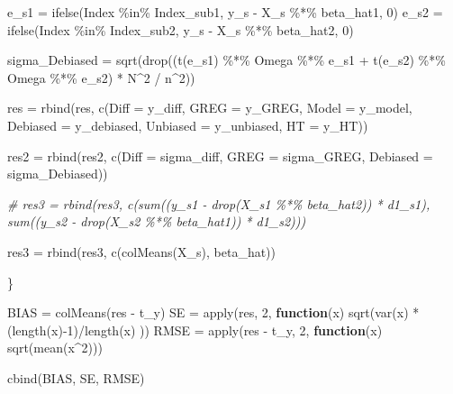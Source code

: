 \documentclass[
]{article}
\newenvironment{Shaded}{\begin{snugshade}}{\end{snugshade}}
\newcommand{\AttributeTok}[1]{\textcolor[rgb]{0.77,0.63,0.00}{#1}}
\newcommand{\CommentTok}[1]{\textcolor[rgb]{0.56,0.35,0.01}{\textit{#1}}}
\newcommand{\ControlFlowTok}[1]{\textcolor[rgb]{0.13,0.29,0.53}{\textbf{#1}}}
\newcommand{\DecValTok}[1]{\textcolor[rgb]{0.00,0.00,0.81}{#1}}
\newcommand{\FunctionTok}[1]{\textcolor[rgb]{0.00,0.00,0.00}{#1}}
\newcommand{\NormalTok}[1]{#1}
\newcommand{\OtherTok}[1]{\textcolor[rgb]{0.56,0.35,0.01}{#1}}
\newcommand{\SpecialCharTok}[1]{\textcolor[rgb]{0.00,0.00,0.00}{#1}}
\begin{document}
\begin{Shaded}
\begin{Highlighting}[]
\NormalTok{e\_s1 }\OtherTok{=} \FunctionTok{ifelse}\NormalTok{(Index }\SpecialCharTok{\%in\%}\NormalTok{ Index\_sub1, y\_s }\SpecialCharTok{{-}}\NormalTok{ X\_s }\SpecialCharTok{\%*\%}\NormalTok{ beta\_hat1, }\DecValTok{0}\NormalTok{)}
\NormalTok{e\_s2 }\OtherTok{=} \FunctionTok{ifelse}\NormalTok{(Index }\SpecialCharTok{\%in\%}\NormalTok{ Index\_sub2, y\_s }\SpecialCharTok{{-}}\NormalTok{ X\_s }\SpecialCharTok{\%*\%}\NormalTok{ beta\_hat2, }\DecValTok{0}\NormalTok{)}

\NormalTok{sigma\_Debiased }\OtherTok{=} \FunctionTok{sqrt}\NormalTok{(}\FunctionTok{drop}\NormalTok{((}\FunctionTok{t}\NormalTok{(e\_s1)  }\SpecialCharTok{\%*\%}\NormalTok{ Omega }\SpecialCharTok{\%*\%}\NormalTok{ e\_s1 }\SpecialCharTok{+} \FunctionTok{t}\NormalTok{(e\_s2)  }\SpecialCharTok{\%*\%}\NormalTok{ Omega }\SpecialCharTok{\%*\%}\NormalTok{ e\_s2) }\SpecialCharTok{*}\NormalTok{ N}\SpecialCharTok{\^{}}\DecValTok{2} \SpecialCharTok{/}\NormalTok{ n}\SpecialCharTok{\^{}}\DecValTok{2}\NormalTok{))}

\NormalTok{res }\OtherTok{=} \FunctionTok{rbind}\NormalTok{(res, }\FunctionTok{c}\NormalTok{(}\AttributeTok{Diff =}\NormalTok{ y\_diff, }\AttributeTok{GREG =}\NormalTok{ y\_GREG, }\AttributeTok{Model =}\NormalTok{ y\_model, }\AttributeTok{Debiased =}\NormalTok{ y\_debiased, }\AttributeTok{Unbiased =}\NormalTok{ y\_unbiased, }\AttributeTok{HT =}\NormalTok{ y\_HT))}

\NormalTok{res2 }\OtherTok{=} \FunctionTok{rbind}\NormalTok{(res2, }\FunctionTok{c}\NormalTok{(}\AttributeTok{Diff =}\NormalTok{ sigma\_diff, }\AttributeTok{GREG =}\NormalTok{ sigma\_GREG, }\AttributeTok{Debiased =}\NormalTok{ sigma\_Debiased))}

\CommentTok{\# res3 = rbind(res3, c(sum((y\_s1 {-} drop(X\_s1 \%*\% beta\_hat2)) * d1\_s1), sum((y\_s2 {-} drop(X\_s2 \%*\% beta\_hat1)) * d1\_s2)))}

\NormalTok{res3 }\OtherTok{=} \FunctionTok{rbind}\NormalTok{(res3, }\FunctionTok{c}\NormalTok{(}\FunctionTok{colMeans}\NormalTok{(X\_s), beta\_hat))}

\NormalTok{\}}

\NormalTok{BIAS }\OtherTok{=} \FunctionTok{colMeans}\NormalTok{(res }\SpecialCharTok{{-}}\NormalTok{ t\_y)}
\NormalTok{SE }\OtherTok{=} \FunctionTok{apply}\NormalTok{(res, }\DecValTok{2}\NormalTok{, }\ControlFlowTok{function}\NormalTok{(x) }\FunctionTok{sqrt}\NormalTok{(}\FunctionTok{var}\NormalTok{(x) }\SpecialCharTok{*}\NormalTok{ (}\FunctionTok{length}\NormalTok{(x)}\SpecialCharTok{{-}}\DecValTok{1}\NormalTok{)}\SpecialCharTok{/}\FunctionTok{length}\NormalTok{(x) ))}
\NormalTok{RMSE }\OtherTok{=} \FunctionTok{apply}\NormalTok{(res }\SpecialCharTok{{-}}\NormalTok{ t\_y, }\DecValTok{2}\NormalTok{, }\ControlFlowTok{function}\NormalTok{(x) }\FunctionTok{sqrt}\NormalTok{(}\FunctionTok{mean}\NormalTok{(x}\SpecialCharTok{\^{}}\DecValTok{2}\NormalTok{)))}

\FunctionTok{cbind}\NormalTok{(BIAS, SE, RMSE)}
\end{Highlighting}
\end{Shaded}
\end{document}

